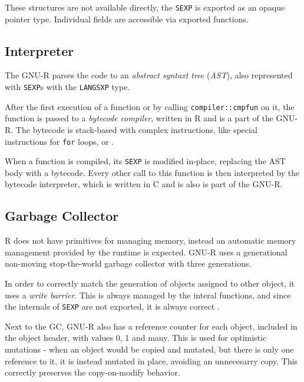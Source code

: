 These structures are not available directly, the \texttt{SEXP} is exported as an opaque pointer type. Individual fields are accessible via exported functions.

\subsection*{Interpreter}

The GNU-R parses the code to an \textit{abstract syntaxt tree} (\textit{AST}), also represented with \texttt{SEXP}s with the \texttt{LANGSXP} type.

After the first execution of a function or by calling \texttt{compiler::cmpfun} on it, the function is passed to a \textit{bytecode compiler}, written in R and is a part of the GNU-R. The bytecode is stack-based with complex instructions, like special instructions for \texttt{for} loops, or .

When a function is compiled, its \texttt{SEXP} is modified in-place, replacing the AST body with a bytecode. Every other call to this function is then interpreted by the bytecode interpreter, which is written in C and is also is part of the GNU-R.

\subsection*{Garbage Collector}
R does not have primitives for managing memory, instead an automatic memory management provided by the runtime is expected. GNU-R uses a generational non-moving stop-the-world garbage collector with three generations\todocite.

In order to correctly match the generation of objects assigned to other object, it uses a \textit{write barrier}\todocite. This is always managed by the interal functions, and since the internals of \texttt{SEXP} are not exported, it is always correct .

Next to the GC, GNU-R also has a reference counter for each object, included in the object header, with values 0, 1 and many. This is used for optimistic mutations - when an object would be copied and mutated, but there is only one reference to it, it is instead mutated in place, avoiding an unnecesarry copy. This correctly preserves the copy-on-modify behavior.

